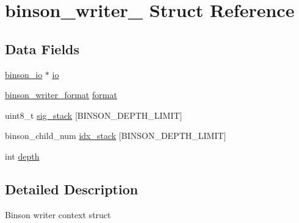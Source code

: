 \hypertarget{structbinson__writer__}{\section{binson\-\_\-writer\-\_\- Struct Reference}
\label{structbinson__writer__}
}
\subsection*{Data Fields}
\begin{DoxyCompactItemize}
\item 
\hyperlink{structbinson__io__}{binson\-\_\-io} $\ast$ \hyperlink{structbinson__writer___ac3e1379fcb1bf00e4541f50350600022}{io}
\item 
\hyperlink{binson__writer_8h_aea4e04083f3bc47ed78011a9653609c1}{binson\-\_\-writer\-\_\-format} \hyperlink{structbinson__writer___aa87af0e0c359af37c271ef50cd1bc98b}{format}
\item 
uint8\-\_\-t \hyperlink{structbinson__writer___a5bbe00e2514ebaac697f3f2f8755ddbe}{sig\-\_\-stack} \mbox{[}B\-I\-N\-S\-O\-N\-\_\-\-D\-E\-P\-T\-H\-\_\-\-L\-I\-M\-I\-T\mbox{]}
\item 
binson\-\_\-child\-\_\-num \hyperlink{structbinson__writer___a9b3c4e8a83f930a2cb63002e26dc23b2}{idx\-\_\-stack} \mbox{[}B\-I\-N\-S\-O\-N\-\_\-\-D\-E\-P\-T\-H\-\_\-\-L\-I\-M\-I\-T\mbox{]}
\item 
int \hyperlink{structbinson__writer___acb5ba97551079e0b072c62c21d784ac5}{depth}
\end{DoxyCompactItemize}


\subsection{Detailed Description}
Binson writer context struct 

